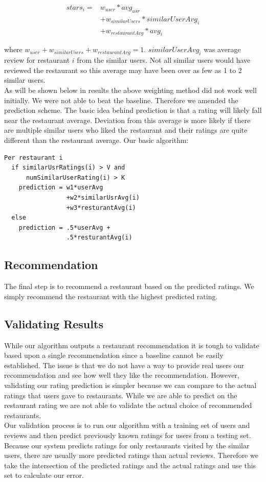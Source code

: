 \documentclass[10pt,twocolumn,letterpaper]{article}
\newcommand{\wu}{\ensuremath{w_{user}}}
\newcommand{\ws}{\ensuremath{w_{similarUsers}}}
\newcommand{\wrst}{\ensuremath{w_{restaurantAvg}}}
\begin{document}
\begin{align*}
stars_{i} = & \wu * avg_{usr}\\
&+ \ws * similarUserAvg_{i}\\
&+ \wrst * avg_{i}
\end{align*}

 where $\wu + \ws + \wrst = 1$. $similarUserAvg_i$ was average review for restaurant $i$ from the similar users. Not all similar users would have reviewed the restaurant so this average may have been over as few as 1 to 2 similar users. 
\\[0.5em]
\indent As will be shown below in results the above weighting method did not work well initially. We were not able to beat the baseline. Therefore we amended the prediction scheme. The basic idea behind prediction is that a rating will likely fall near the restaurant average. Deviation from this average is more likely if there are multiple similar users who liked the restaurant and their ratings are quite different than the restaurant average. Our basic algorithm:
\begin{verbatim}
Per restaurant i
  if similarUsrRatings(i) > V and
      numSimilarUserRating(i) > K
    prediction = w1*userAvg
                 +w2*similarUsrAvg(i)
                 +w3*resturantAvg(i)
  else
    prediction = .5*userAvg +
                 .5*resturantAvg(i)
\end{verbatim}

\subsection{Recommendation}
The final step is to recommend a restaurant based on the predicted ratings. We simply recommend the restaurant with the highest predicted rating.

\subsection{Validating Results}
While our algorithm outputs a restaurant recommendation it is tough to validate based upon a single recommendation since a baseline cannot be easily established. The issue is that we do not have a way to provide real users our recommendation and see how well they like the recommendation. However, validating our rating prediction is simpler because we can compare to the actual ratings that users gave to restaurants. While we are able to predict on the restaurant rating we are not able to validate the actual choice of recommended restaurants.
\\[0.5em]
\indent Our validation process is to run our algorithm with a training set of users and reviews and then predict previously known ratings for users from a testing set. Because our system predicts ratings for only restaurants visited by the similar users, there are usually more predicted ratings than actual reviews. Therefore we take the intersection of the predicted ratings and the actual ratings and use this set to calculate our error.
\end{document}
